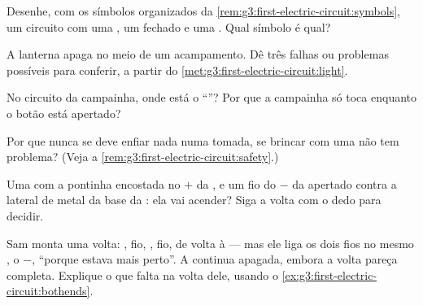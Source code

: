 \begin{exercise}[$\star$]\label{exo:g3:first-electric-circuit:5}
Desenhe, com os símbolos organizados da
\cref{rem:g3:first-electric-circuit:symbols}, um circuito com uma
, um  fechado e uma . Qual símbolo é qual?
\end{exercise}

\begin{exercise}[$\star$]\label{exo:g3:first-electric-circuit:6}
A lanterna apaga no meio de um acampamento. Dê três falhas ou
problemas possíveis para conferir, a partir do
\cref{met:g3:first-electric-circuit:light}.
\end{exercise}

\begin{exercise}[$\star$]\label{exo:g3:first-electric-circuit:7}
No circuito da campainha, onde está o ``''? Por que a
campainha só toca enquanto o botão está apertado?
\end{exercise}

\begin{exercise}[$\star$]\label{exo:g3:first-electric-circuit:8}
Por que nunca se deve enfiar nada numa tomada, se brincar com uma
 não tem problema? (Veja a
\cref{rem:g3:first-electric-circuit:safety}.)
\end{exercise}

\begin{exercise}[$\star$]\label{exo:g3:first-electric-circuit:9}
Uma  com a pontinha encostada no  $+$ da , e um
fio do  $-$ da  apertado contra a lateral de metal da
base da : ela vai acender? Siga a volta com o dedo para
decidir.
\end{exercise}

\begin{exercise}[$\star\star$]\label{exo:g3:first-electric-circuit:10}
Sam monta uma volta: , fio, , fio, de volta à  ---
mas ele liga os dois fios no mesmo , o $-$, ``porque estava
mais perto''. A  continua apagada, embora a volta pareça
completa. Explique o que falta na volta dele, usando o
\cref{ex:g3:first-electric-circuit:bothends}.
\end{exercise}

